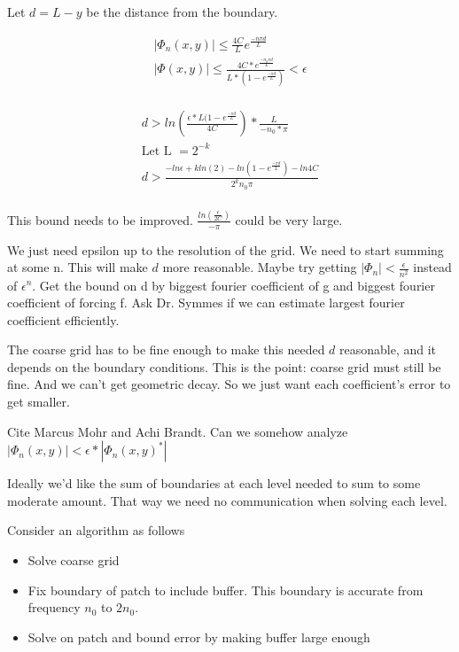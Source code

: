 \documentclass[12pt]{article}
\begin{document}
Let $d = L-y$ be the distance from the boundary. 

\begin{align*}
|\Phi_n(x, y)| \leq \frac{4C}{L} e^\frac{{-n \pi d}}{L} \\
|\Phi(x, y)| \leq \frac{4C * e^\frac{-n_0 \pi d}{L}}{L*(1 - e^\frac{-\pi d}{L})} < \epsilon\\
\end{align*}

\begin{align*}
d > ln(\frac{\epsilon * L(1 - e^\frac{-\pi d}{L}}{{4C}})*\frac{L}{-n_0 * \pi}\\
\text{Let L }= 2^{-k} \\
d > \frac{-ln\epsilon + kln(2) - ln(1 - e^\frac{-\pi d}{L}) - ln4C }{2^k n_0 \pi}\\
\end{align*}

This bound needs to be improved. $\frac{ln(\frac{\epsilon}{2C})}{-\pi}$ could be very large. 

We just need epsilon up to the resolution of the grid. We need to start summing at some n. This will make $d$ more reasonable. Maybe try getting $|\Phi_n| < \frac{\epsilon}{n^2}$ instead of $\epsilon^n$. Get the bound on d by biggest fourier coefficient of g and biggest fourier coefficient of forcing f. Ask Dr. Symmes if we can estimate largest fourier coefficient efficiently. 

The coarse grid has to be fine enough to make this needed $d$ reasonable, and it depends on the boundary conditions. This is the point: coarse grid must still be fine. And we can't get geometric decay. So we just want each coefficient's error to get smaller. 

Cite Marcus Mohr and Achi Brandt. Can we somehow analyze $|\Phi_n(x, y)| < \epsilon * |\Phi_n(x, y)^*|$

Ideally we'd like the sum of boundaries at each level needed to sum to some moderate amount. That way we need no communication when solving each level. 

Consider an algorithm as follows

\begin{itemize}
\item Solve coarse grid
\item Fix boundary of patch to include buffer. This boundary is accurate from frequency $n_0$ to $2n_0$. 
\item Solve on patch and bound error by making buffer large enough
\end{itemize}
\end{document}
